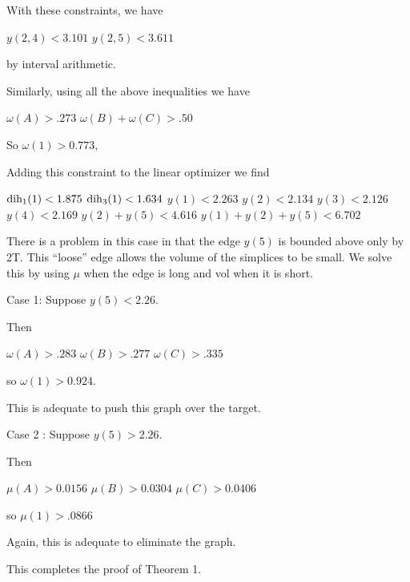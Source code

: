 With these constraints, we have

$y(2,4) < 3.101$ \newline
$y(2,5) < 3.611$ \newline

by interval arithmetic.

Similarly, using all the above inequalities we have

$\omega(A) > .273$ \newline
$\omega(B)+\omega(C) > .50$ \newline

So $\omega(1)>0.773$,

Adding this constraint to the linear optimizer we find

$\operatorname{dih}_1(1)<1.875$ \newline
$\operatorname{dih}_3(1)<1.634$ \newline
$y(1)<2.263$ \newline
$y(2)<2.134$ \newline
$y(3)<2.126$ \newline
$y(4)<2.169$ \newline
$y(2)+y(5)<4.616$ \newline
$y(1)+y(2)+y(5)<6.702$ \newline

There is a problem in this case in that the edge $y(5)$ is bounded above only by 2T.  This ``loose'' edge allows the volume of the simplices to be small.
We solve this by using $\mu$ when the edge is long and vol when it is short.

Case 1: Suppose $y(5)<2.26$.

Then 

$\omega(A)>.283$ \newline
$\omega(B)>.277$ \newline
$\omega(C)>.335$ \newline

so $\omega(1)>0.924.$  

This is adequate to push this graph over the target.

Case 2 : Suppose $y(5)>2.26.$

Then

$\mu(A)>0.0156$ \newline
$\mu(B)>0.0304$ \newline
$\mu(C)>0.0406$ \newline

so $\mu(1)>.0866$

Again, this is adequate to eliminate the graph.

This completes the proof of Theorem 1.

